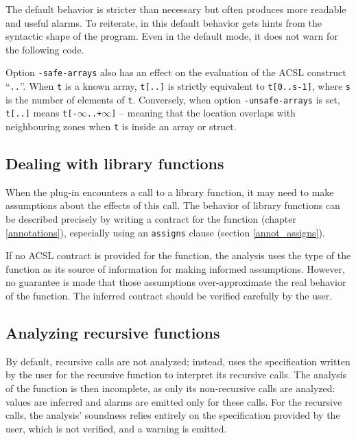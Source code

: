 \documentclass{frama-c-book}
\begin{document}
The default behavior is stricter than necessary but often produces more
readable and useful alarms. To reiterate, in this default behavior
\Eva{} gets hints from the syntactic shape of the program.
Even in the default mode, it does not warn for the following code.
\begin{listing}{4}
  int *p=&t[0][12];
  return *p;
}
\end{listing}

Option \lstinline|-safe-arrays| also has an effect on the evaluation
of the ACSL construct ``\lstinline|..|''. When \lstinline|t| is a
known array, \lstinline|t[..]| is strictly equivalent to
\lstinline|t[0..s-1]|, where \lstinline|s| is the number of elements
of \lstinline|t|. Conversely, when option \lstinline|-unsafe-arrays| is
set, \lstinline|t[..]| means
\lstinline|t[-|$\infty$\lstinline|..+|$\infty$\lstinline|]| -- meaning
that the location overlaps with neighbouring zones when \lstinline|t| is
inside an array or struct.

\subsection{Dealing with library functions}

When the \Eva{} plug-in encounters a call to a library
function, it may need to make assumptions about the effects of this call.
The behavior of library functions can be described precisely
by writing a contract for the function (chapter \ref{annotations}),
especially using an \lstinline|assigns| clause (section \ref{annot_assigns}).

If no ACSL contract is provided for the function, the analysis uses the
type of the function as its source of information for making
informed assumptions. However, no guarantee is made that those assumptions
over-approximate the real behavior of the function. The inferred
contract should be verified carefully by the user.

\subsection{Analyzing recursive functions}
\label{recursion}

By default, recursive calls are not analyzed; instead, \Eva{} uses the
specification written by the user for the recursive function to interpret
its recursive calls. The analysis of the function is then incomplete,
as only its non-recursive calls are analyzed: values are inferred and
alarms are emitted only for these calls.
For the recursive calls, the analysis' soundness relies entirely on the
specification provided by the user, which is not verified, and a warning
is emitted.
\end{document}

